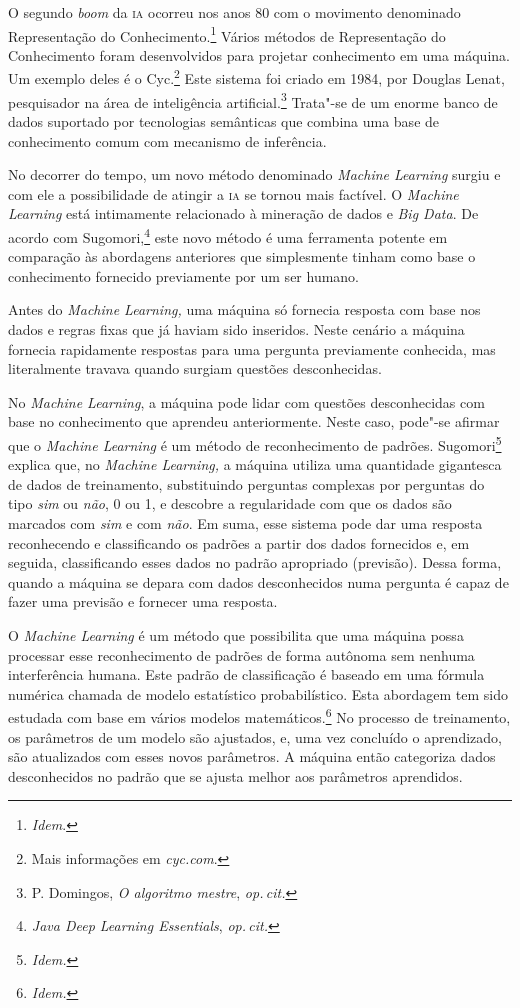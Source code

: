 O segundo \textit{boom} da \textsc{ia} ocorreu nos anos 80 com o movimento
denominado Representação do Conhecimento.\footnote{\textit{Idem}.} Vários
métodos de Representação do Conhecimento foram desenvolvidos para
projetar conhecimento em uma máquina. Um exemplo deles é o Cyc.\footnote{Mais informações em \textit{cyc.com}.}
Este sistema foi criado em 1984, por Douglas Lenat, pesquisador na área
de inteligência artificial.\footnote{P. Domingos, \textit{O algoritmo mestre}, \textit{op.\,cit.}}
Trata"-se de um enorme banco
de dados suportado por tecnologias semânticas que combina uma base de
conhecimento comum com mecanismo de inferência.

No decorrer do tempo, um novo método denominado \textit{Machine Learning} surgiu e com ele a possibilidade de atingir a
\textsc{ia} se tornou mais factível. O \textit{Machine Learning} está intimamente
relacionado à mineração de dados e \textit{Big Data}. De acordo com
Sugomori,\footnote{\textit{Java Deep Learning Essentials}, \textit{op.\,cit.}} este novo método é uma ferramenta potente em comparação
às abordagens anteriores que simplesmente tinham como base o
conhecimento fornecido previamente por um ser humano.

Antes do \textit{Machine Learning,} uma máquina só fornecia resposta com
base nos dados e regras fixas que já haviam sido inseridos. Neste
cenário a máquina fornecia rapidamente respostas para uma pergunta
previamente conhecida, mas literalmente travava quando surgiam questões
desconhecidas.

No \textit{Machine Learning}, a máquina pode lidar com questões
desconhecidas com base no conhecimento que aprendeu anteriormente. Neste
caso, pode"-se afirmar que o \textit{Machine Learning} é um método de
reconhecimento de padrões. Sugomori\footnote{\textit{Idem.}} explica que, no \textit{Machine
Learning,} a máquina utiliza uma quantidade gigantesca de dados de
treinamento, substituindo perguntas complexas por perguntas do tipo
\textit{sim} ou \textit{não}, 0 ou 1, e descobre a regularidade com que os dados
são marcados com \textit{sim} e com \textit{não}. Em suma, esse sistema pode dar
uma resposta reconhecendo e classificando os padrões a partir dos dados
fornecidos e, em seguida, classificando esses dados no padrão apropriado
(previsão). Dessa forma, quando a máquina se depara com dados
desconhecidos numa pergunta é capaz de fazer uma previsão e fornecer uma
resposta.

O \textit{Machine Learning} é um método que possibilita que uma máquina
possa processar esse reconhecimento de padrões de forma autônoma sem
nenhuma interferência humana. Este padrão de classificação é baseado em
uma fórmula numérica chamada de modelo estatístico probabilístico. Esta
abordagem tem sido estudada com base em vários modelos matemáticos.\footnote{\textit{Idem.}} 
No processo de treinamento, os parâmetros de um modelo
são ajustados, e, uma vez concluído o aprendizado, são atualizados com
esses novos parâmetros. A máquina então categoriza dados desconhecidos
no padrão que se ajusta melhor aos parâmetros aprendidos.

